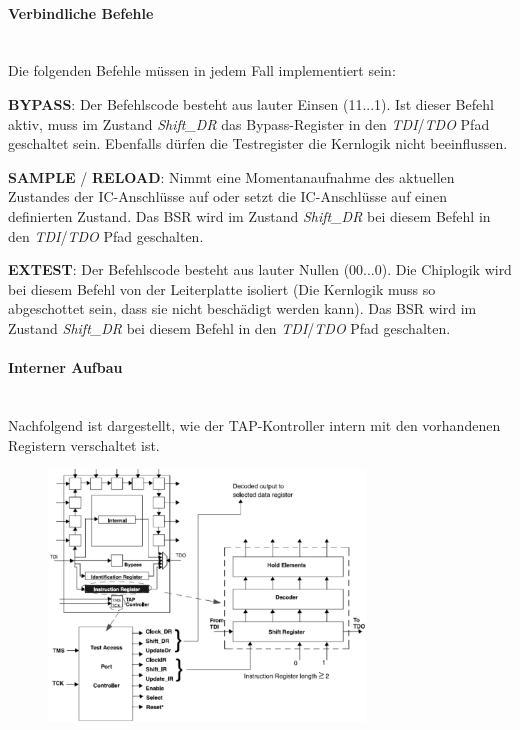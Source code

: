 \paragraph{Verbindliche Befehle}$~$ \\
Die folgenden Befehle müssen in jedem Fall implementiert sein:
\begin{compactitem}
    \item \textbf{BYPASS}: Der Befehlscode besteht aus lauter Einsen (11...1). Ist dieser Befehl aktiv, muss im Zustand \textit{Shift\_DR} das Bypass-Register in den \textit{TDI}/\textit{TDO} Pfad geschaltet sein. Ebenfalls dürfen die Testregister die Kernlogik nicht beeinflussen.
    \item \textbf{SAMPLE} / \textbf{RELOAD}: Nimmt eine Momentanaufnahme des aktuellen Zustandes der IC-Anschlüsse auf oder setzt die IC-Anschlüsse auf einen definierten Zustand. Das BSR wird im Zustand \textit{Shift\_DR} bei diesem Befehl in den \textit{TDI}/\textit{TDO} Pfad geschalten.
    \item \textbf{EXTEST}: Der Befehlscode besteht aus lauter Nullen (00...0). Die Chiplogik wird bei diesem Befehl von der Leiterplatte isoliert (Die Kernlogik muss so abgeschottet sein, dass sie nicht beschädigt werden kann). Das BSR wird im Zustand \textit{Shift\_DR} bei diesem Befehl in den \textit{TDI}/\textit{TDO} Pfad geschalten.
\end{compactitem}

\paragraph{Interner Aufbau}$~$ \\
Nachfolgend ist dargestellt, wie der TAP-Kontroller intern mit den vorhandenen Registern verschaltet ist.
\begin{figure}[H]
    \includegraphics[width=0.75\textwidth]{images/bst_tapkontroller_verschaltung.png}
\end{figure}

